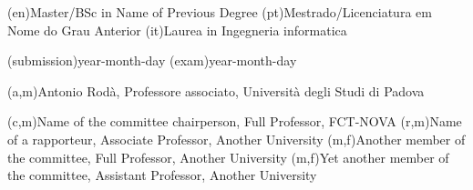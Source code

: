 \ntauthordegree(en){Master/BSc in Name of Previous Degree}
\ntauthordegree(pt){Mestrado/Licenciatura em Nome do Grau Anterior}
\ntauthordegree(it){Laurea in Ingegneria informatica}

\ntdate(submission){year-month-day}
\ntdate(exam){year-month-day}

(a,m){Antonio Rodà, Professore associato, Università degli Studi di Padova}

(c,m){Name of the committee chairperson, Full Professor, FCT-NOVA}
(r,m){Name of a rapporteur, Associate Professor, Another University}
(m,f){Another member of the committee, Full Professor, Another University}
(m,f){Yet another member of the committee, Assistant Professor, Another University}
